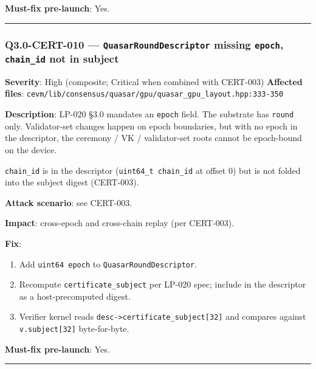 \documentclass[
]{article}
\providecommand{\tightlist}{%
  \setlength{\itemsep}{0pt}\setlength{\parskip}{0pt}}
\begin{document}
\textbf{Must-fix pre-launch}: Yes.

\begin{center}\rule{0.5\linewidth}{0.5pt}\end{center}

\subsubsection{\texorpdfstring{Q3.0-CERT-010 ---
\texttt{QuasarRoundDescriptor} missing \texttt{epoch},
\texttt{chain\_id} not in
subject}{Q3.0-CERT-010 --- QuasarRoundDescriptor missing epoch, chain\_id not in subject}}\label{q30-cert-010--quasarrounddescriptor-missing-epoch-chain_id-not-in-subject}

\textbf{Severity}: High (composite; Critical when combined with
CERT-003) \textbf{Affected files}:
\texttt{cevm/lib/consensus/quasar/gpu/quasar\_gpu\_layout.hpp:333-350}

\textbf{Description}: LP-020 §3.0 mandates an \texttt{epoch} field. The
substrate has \texttt{round} only. Validator-set changes happen on epoch
boundaries, but with no epoch in the descriptor, the ceremony / VK /
validator-set roots cannot be epoch-bound on the device.

\texttt{chain\_id} is in the descriptor (\texttt{uint64\_t\ chain\_id}
at offset 0) but is not folded into the subject digest (CERT-003).

\textbf{Attack scenario}: see CERT-003.

\textbf{Impact}: cross-epoch and cross-chain replay (per CERT-003).

\textbf{Fix}:

\begin{enumerate}
\def\labelenumi{\arabic{enumi}.}
\tightlist
\item
  Add \texttt{uint64\ epoch} to \texttt{QuasarRoundDescriptor}.
\item
  Recompute \texttt{certificate\_subject} per LP-020 spec; include in
  the descriptor as a host-precomputed digest.
\item
  Verifier kernel reads
  \texttt{desc-\textgreater{}certificate\_subject{[}32{]}} and compares
  against \texttt{v.subject{[}32{]}} byte-for-byte.
\end{enumerate}

\textbf{Must-fix pre-launch}: Yes.

\begin{center}\rule{0.5\linewidth}{0.5pt}\end{center}
\end{document}
